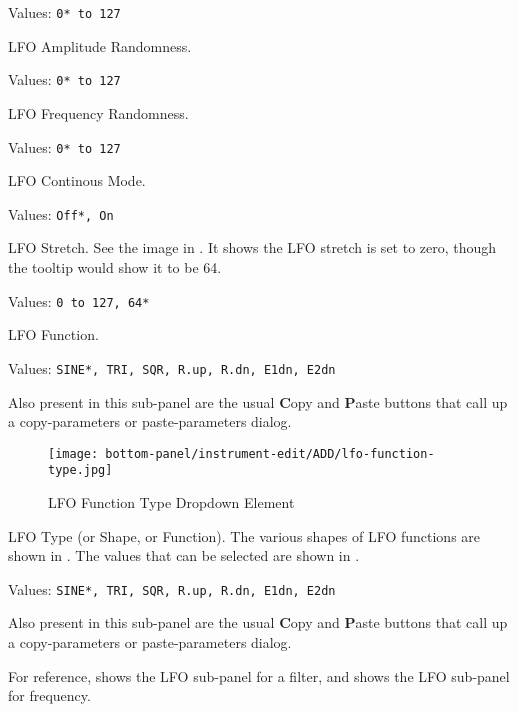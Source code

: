    Values: \texttt{0* to 127}

   LFO Amplitude Randomness.

   Values: \texttt{0* to 127}

   LFO Frequency Randomness.

   Values: \texttt{0* to 127}

   LFO Continous Mode.

   Values: \texttt{Off*, On}

   LFO Stretch. See the image in
   .
   It shows the LFO stretch is set to zero,
   though the tooltip would show it to be 64.

   Values: \texttt{0 to 127, 64*}

   LFO Function.

   Values: \texttt{SINE*, TRI, SQR, R.up, R.dn, E1dn, E2dn}

   Also present in this sub-panel are the usual \textbf{C}opy
   and \textbf{P}aste buttons that call up a copy-parameters or
   paste-parameters dialog.

\begin{figure}[H]
   \centering 
   \texttt{[image: bottom-panel/instrument-edit/ADD/lfo-function-type.jpg]}
   \caption[LFO Type Dropdown]{LFO Function Type Dropdown Element}
   \label{fig:lfo_function_type_dropdown}
\end{figure}

   LFO Type (or Shape, or Function).
   The various shapes of LFO functions are shown in
   .
   The values that can be selected are shown in
   .

   Values: \texttt{SINE*, TRI, SQR, R.up, R.dn, E1dn, E2dn}


   Also present in this sub-panel are the usual \textbf{C}opy
   and \textbf{P}aste buttons that call up a copy-parameters or
   paste-parameters dialog.

   For reference,
   shows the LFO sub-panel for a filter, and
   shows the LFO sub-panel for frequency.

